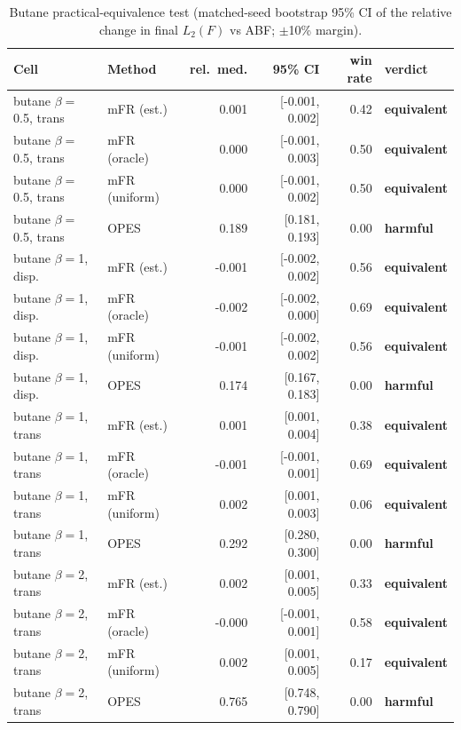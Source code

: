 \begin{table}[t]\centering\small
\caption{Butane practical-equivalence test (matched-seed bootstrap 95\% CI of the relative change in final $L_2(F)$ vs ABF; $\pm$10\% margin).}\label{tab:alk_equivalence}
\begin{tabular}{llrrrl}\toprule
Cell & Method & rel.\ med. & 95\% CI & win rate & verdict \\\midrule
butane $\beta{=}$0.5, trans & mFR (est.) & 0.001 & [-0.001, 0.002] & 0.42 & \textbf{equivalent} \\
butane $\beta{=}$0.5, trans & mFR (oracle) & 0.000 & [-0.001, 0.003] & 0.50 & \textbf{equivalent} \\
butane $\beta{=}$0.5, trans & mFR (uniform) & 0.000 & [-0.001, 0.002] & 0.50 & \textbf{equivalent} \\
butane $\beta{=}$0.5, trans & OPES & 0.189 & [0.181, 0.193] & 0.00 & \textbf{harmful} \\
butane $\beta{=}$1, disp. & mFR (est.) & -0.001 & [-0.002, 0.002] & 0.56 & \textbf{equivalent} \\
butane $\beta{=}$1, disp. & mFR (oracle) & -0.002 & [-0.002, 0.000] & 0.69 & \textbf{equivalent} \\
butane $\beta{=}$1, disp. & mFR (uniform) & -0.001 & [-0.002, 0.002] & 0.56 & \textbf{equivalent} \\
butane $\beta{=}$1, disp. & OPES & 0.174 & [0.167, 0.183] & 0.00 & \textbf{harmful} \\
butane $\beta{=}$1, trans & mFR (est.) & 0.001 & [0.001, 0.004] & 0.38 & \textbf{equivalent} \\
butane $\beta{=}$1, trans & mFR (oracle) & -0.001 & [-0.001, 0.001] & 0.69 & \textbf{equivalent} \\
butane $\beta{=}$1, trans & mFR (uniform) & 0.002 & [0.001, 0.003] & 0.06 & \textbf{equivalent} \\
butane $\beta{=}$1, trans & OPES & 0.292 & [0.280, 0.300] & 0.00 & \textbf{harmful} \\
butane $\beta{=}$2, trans & mFR (est.) & 0.002 & [0.001, 0.005] & 0.33 & \textbf{equivalent} \\
butane $\beta{=}$2, trans & mFR (oracle) & -0.000 & [-0.001, 0.001] & 0.58 & \textbf{equivalent} \\
butane $\beta{=}$2, trans & mFR (uniform) & 0.002 & [0.001, 0.005] & 0.17 & \textbf{equivalent} \\
butane $\beta{=}$2, trans & OPES & 0.765 & [0.748, 0.790] & 0.00 & \textbf{harmful} \\

\end{tabular}
\end{table}
